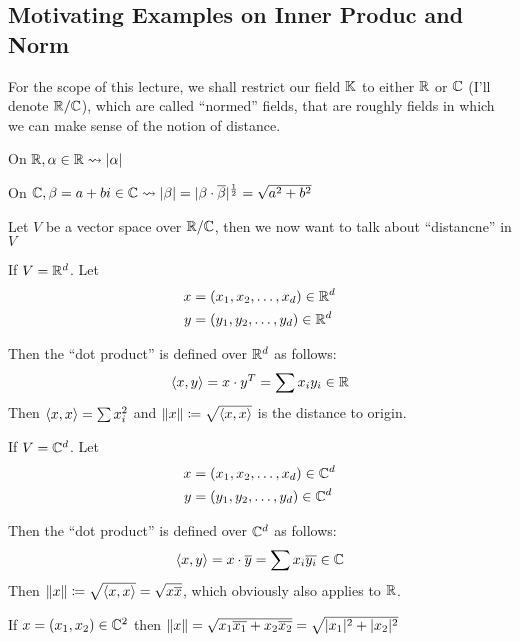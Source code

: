 
\subsection{Motivating Examples on Inner Produc and Norm}
\begin{remark}
    For the scope of this lecture, we shall restrict our field \(\mathbb{K}\) to either \(\mathbb{R}\) or \(\mathbb{C}\) (I'll denote \(\mathbb{R} / \mathbb{C}\)), which are called ``normed'' fields, that are roughly fields in which we can make sense of the notion of distance.
\end{remark}

\begin{example}
    On \(\mathbb{R}, \alpha \in \mathbb{R} \leadsto \lvert\alpha\rvert\)

    On \(\mathbb{C}, \beta = a + bi \in \mathbb{C} \leadsto \lvert\beta\rvert = \lvert\beta \cdot \overline{\beta}\rvert^{\frac{1}{2}} = \sqrt{a^2 + b^2}\)
\end{example}

Let \(V\) be a vector space over \(\mathbb{R} /\mathbb{C}\), then we now want to talk about ``distancne'' in \(V\)

\begin{example}
    If \(V = \mathbb{R}^d\). Let \begin{align*}
        x & = (x_1, x_2, \dots, x_d) \in \mathbb{R}^d \\
        y & = (y_1, y_2, \dots, y_d) \in \mathbb{R}^d
    \end{align*}

    Then the ``dot product'' is defined over \(\mathbb{R}^d\) as follows: \[
        \langle x, y \rangle = x \cdot y^T = \sum x_i y_i \in \mathbb{R}
    \]
    Then \(\langle x, x \rangle = \sum x_i^2\) and \(\lVert x\rVert \coloneqq \sqrt{\langle x, x \rangle}\) is the distance to origin.
\end{example}


\begin{example}
    If \(V = \mathbb{C}^d\). Let \begin{align*}
        x & = (x_1, x_2, \dots, x_d) \in \mathbb{C}^d \\
        y & = (y_1, y_2, \dots, y_d) \in \mathbb{C}^d
    \end{align*}

    Then the ``dot product'' is defined over \(\mathbb{C}^d\) as follows: \[
        \langle x, y \rangle = x \cdot \overline{y} =\sum x_i \overline{y_i}  \in \mathbb{C}
    \]
    Then \(\lVert x\rVert \coloneqq \sqrt{\langle x, x \rangle} = \sqrt{x \overline{x}}\), which obviously also applies to \(\mathbb{R}\).

    If \(x = (x_1, x_2) \in \mathbb{C}^2\) then \(\lVert x\rVert = \sqrt{x_1 \overline{x_1} + x_2 \overline{x_2}} = \sqrt{\lvert x_1\rvert^2 + \lvert x_2\rvert^2}\)
\end{example}

